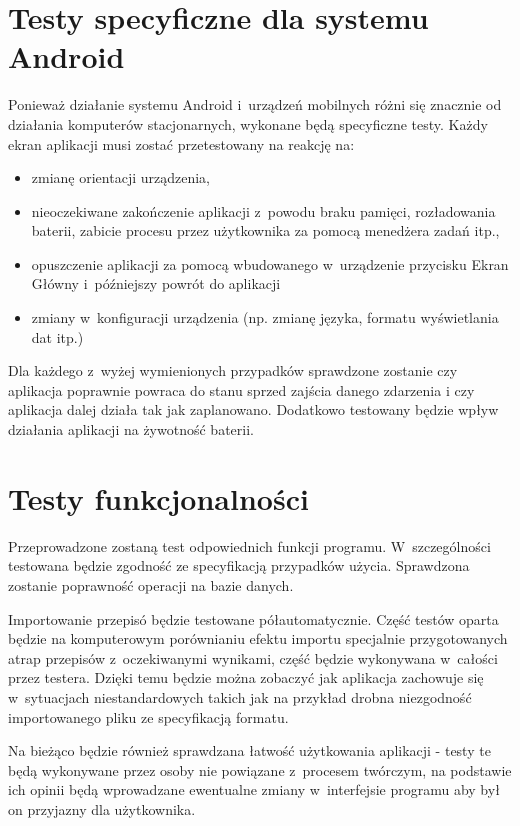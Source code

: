\documentclass[a4paper,11pt,titlepage,twoside]{mwart}
\begin{document}
\section{Testy specyficzne dla systemu Android}
Ponieważ działanie systemu Android i~urządzeń mobilnych różni się znacznie od działania komputerów stacjonarnych, wykonane będą specyficzne testy. Każdy ekran aplikacji musi zostać przetestowany na reakcję na:
\begin{itemize}
  \item zmianę orientacji urządzenia,
  \item nieoczekiwane zakończenie aplikacji z~powodu braku pamięci, rozładowania baterii, zabicie procesu przez użytkownika za pomocą menedżera zadań itp.,
  \item opuszczenie aplikacji za pomocą wbudowanego w~urządzenie przycisku Ekran Główny i~późniejszy powrót do aplikacji
  \item zmiany w~konfiguracji urządzenia (np. zmianę języka, formatu wyświetlania dat itp.)
\end{itemize}
Dla każdego z~wyżej wymienionych przypadków sprawdzone zostanie czy aplikacja poprawnie powraca do stanu sprzed zajścia danego zdarzenia i czy aplikacja dalej działa tak jak zaplanowano. Dodatkowo testowany będzie wpływ działania aplikacji na żywotność baterii.
\section{Testy funkcjonalności}
Przeprowadzone zostaną test odpowiednich funkcji programu. W~szczególności testowana będzie zgodność ze specyfikacją przypadków użycia. Sprawdzona zostanie poprawność operacji na bazie danych.

Importowanie przepisó będzie testowane półautomatycznie. Część testów oparta będzie na komputerowym porównianiu efektu importu specjalnie przygotowanych atrap przepisów z~oczekiwanymi wynikami, część będzie wykonywana w~całości przez testera. Dzięki temu będzie można zobaczyć jak aplikacja zachowuje się w~sytuacjach niestandardowych takich jak na przykład drobna niezgodność importowanego pliku ze specyfikacją formatu.

Na bieżąco będzie również sprawdzana łatwość użytkowania aplikacji - testy te będą wykonywane przez osoby nie powiązane z~procesem twórczym, na podstawie ich opinii będą wprowadzane ewentualne zmiany w~interfejsie programu aby był on przyjazny dla użytkownika.
\end{document}
